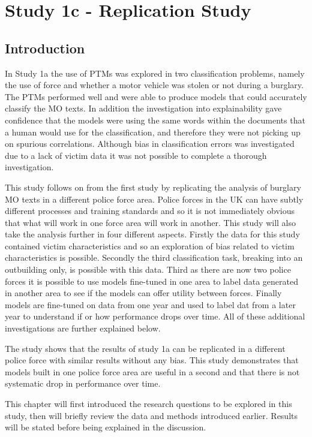 \chapter{Study 1c - Replication Study}

\section{Introduction} In Study 1a the use of PTMs was explored in two classification problems, namely the use of force and whether a motor vehicle was stolen or not during a burglary. The PTMs performed well and were able to produce models that could accurately classify the MO texts. In addition the investigation into explainability gave confidence that the models were using the same words within the documents that a human would use for the classification, and therefore they were not picking up on spurious correlations. Although bias in classification errors was investigated due to a lack of victim data it was not possible to complete a thorough investigation.

This study follows on from the first study by replicating the analysis of burglary MO texts in a different police force area. Police forces in the UK can have subtly different processes and training standards and so it is not immediately obvious that what will work in one force area will work in another. This study will also take the analysis further in four different aspects. Firstly the data for this study contained victim characteristics and so an exploration of bias related to victim characteristics is possible. Secondly the third classification task, breaking into an outbuilding only, is possible with this data. Third as there are now two police forces it is possible to use models fine-tuned in one area to label data generated in another area to see if the models can offer utility between forces. Finally models are fine-tuned on data from one year and used to label dat from a later year to understand if or how performance drops over time. All of these additional investigations are further explained below.

The study shows that the results of study 1a can be replicated in a different police force with similar results without any bias. This study demonstrates that models built in one police force area are useful in a second and that there is not systematic drop in performance over time.

This chapter will first introduced the research questions to be explored in this study, then will briefly review the data and methods introduced earlier. Results will be stated before being explained in the discussion.



